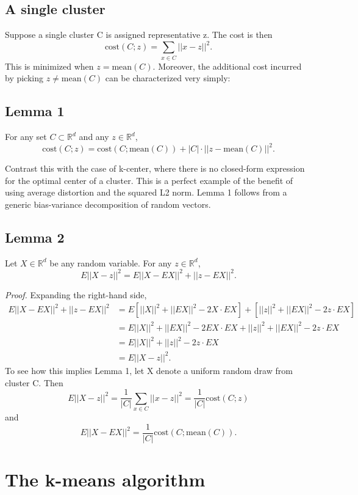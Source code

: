 \documentclass{article}
\begin{document}
\subsection{A single cluster}

Suppose a single cluster C is assigned representative z. The cost is then
\[ \text{cost}(C; z) = \sum_{x \in C} ||x - z||^2. \]
This is minimized when $z = \text{mean}(C)$. Moreover, the additional cost incurred by picking $z \neq \text{mean}(C)$ can be characterized very simply:

\subsection*{Lemma 1}
For any set $C \subset \mathbb{R}^d$ and any $z \in \mathbb{R}^d$,
\[ \text{cost}(C; z) = \text{cost}(C; \text{mean}(C)) + |C| \cdot ||z - \text{mean}(C)||^2. \]

Contrast this with the case of k-center, where there is no closed-form expression for the optimal center of a cluster. This is a perfect example of the benefit of using average distortion and the squared L2 norm.
Lemma 1 follows from a generic bias-variance decomposition of random vectors.

\subsection*{Lemma 2}
Let $X \in \mathbb{R}^d$ be any random variable. For any $z \in \mathbb{R}^d$,
\[ E||X - z||^2 = E||X - EX||^2 + ||z - EX||^2. \]

\textit{Proof.} Expanding the right-hand side,
\begin{align*}
E||X - EX||^2 + ||z - EX||^2 &= E[||X||^2 + ||EX||^2 - 2X \cdot EX] + [||z||^2 + ||EX||^2 - 2z \cdot EX] \\
&= E||X||^2 + ||EX||^2 - 2EX \cdot EX + ||z||^2 + ||EX||^2 - 2z \cdot EX \\
&= E||X||^2 + ||z||^2 - 2z \cdot EX \\
&= E||X - z||^2.
\end{align*}
To see how this implies Lemma 1, let X denote a uniform random draw from cluster C. Then
\[ E||X - z||^2 = \frac{1}{|C|} \sum_{x \in C} ||x - z||^2 = \frac{1}{|C|} \text{cost}(C; z) \]
and
\[ E||X - EX||^2 = \frac{1}{|C|} \text{cost}(C; \text{mean}(C)). \]

\section{The k-means algorithm}
\end{document}
